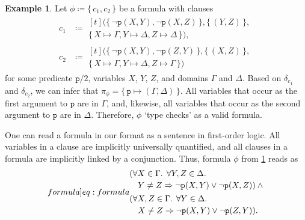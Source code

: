 \documentclass{article}
\theoremstyle{definition}
\newtheorem{example}{Example}
\theoremstyle{remark}
\begin{document}
\begin{example}\label{example:first}
  Let $\phi \coloneqq \{\, c_1, c_2 \,\}$ be a formula with clauses
  \begin{align*}
    c_1 &\coloneqq
          \begin{multlined}[t]
            (\{\, \neg \texttt{p}(X, Y), \neg \texttt{p}(X, Z) \,\}, \{\, (Y, Z) \,\}, \\
            \{\, X \mapsto \Gamma, Y \mapsto \Delta, Z \mapsto \Delta \,\}),
          \end{multlined}\\
    c_2 &\coloneqq
          \begin{multlined}[t]
            (\{\, \neg \texttt{p}(X, Y), \neg \texttt{p}(Z, Y) \,\}, \{\, (X, Z) \,\}, \\
            \{\, X \mapsto \Gamma, Y \mapsto \Delta, Z \mapsto \Gamma \,\})
          \end{multlined}
  \end{align*}
  for some predicate $\texttt{p}/2$, variables $X$, $Y$, $Z$, and domains
  $\Gamma$ and $\Delta$. Based on $\delta_{c_{1}}$ and $\delta_{c_{2}}$, we can
  infer that $\pi_{\phi} = \{\, \texttt{p} \mapsto (\Gamma, \Delta) \,\}$. All
  variables that occur as the first argument to $\texttt{p}$ are in $\Gamma$,
  and, likewise, all variables that occur as the second argument to $\texttt{p}$
  are in $\Delta$. Therefore, $\phi$ `type checks' as a valid formula.
\end{example}

One can read a formula in our format as a sentence in first-order logic. All
variables in a clause are implicitly universally quantified, and all clauses in
a formula are implicitly linked by a conjunction. Thus, formula $\phi$ from
\cref{example:first} reads as
\begin{equation}\label[formula]{eq:formula}
  \begin{split}
    &\begin{multlined}[t]
      (\forall X \in \Gamma\text{. }\forall Y, Z \in \Delta\text{. }\\
      Y \ne Z \Rightarrow \neg \texttt{p}(X, Y) \lor \neg \texttt{p}(X, Z)) \land{}
    \end{multlined}\\
    &\begin{multlined}[t]
      (\forall X, Z \in \Gamma\text{. }\forall Y \in \Delta\text{. }\\
      X \ne Z \Rightarrow \neg \texttt{p}(X, Y) \lor \neg \texttt{p}(Z, Y)).
    \end{multlined}
  \end{split}
\end{equation}
\end{document}

